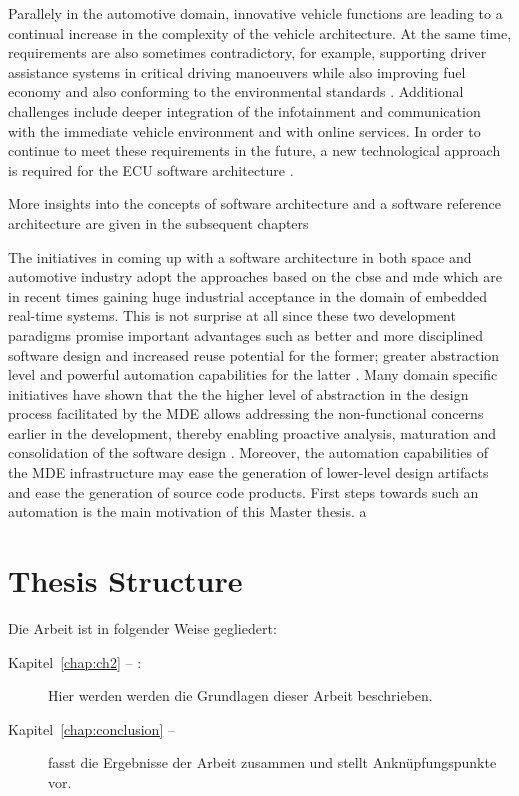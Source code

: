 Parallely in the automotive domain, innovative vehicle functions are leading to a continual increase in the complexity of the vehicle architecture. At the same time, requirements are also sometimes contradictory, for example, supporting driver assistance systems in critical driving manoeuvers while also improving fuel economy and also conforming to the environmental standards \cite{AUTOSARurl}. Additional challenges include deeper integration of the infotainment and communication with the immediate vehicle environment and with online services. In order to continue to meet these requirements in the future, a new technological approach is required for the ECU software architecture \cite{AUTOSARurl}.  

More insights into the concepts of software architecture and a software reference architecture are given in the subsequent chapters     

The initiatives in coming up with a software architecture in both space and automotive industry adopt the approaches based on the \ac{cbse} and \ac{mde} which are in recent times gaining huge industrial acceptance in the domain of embedded real-time systems. This is not surprise at all since these two development paradigms promise important advantages such as better and more disciplined software design and increased reuse potential for the former; greater abstraction level and powerful automation capabilities for the latter \cite{CBSE}\cite{PhdThesis}. Many domain specific initiatives have shown that the the higher level of abstraction in the design process facilitated by the MDE allows addressing the non-functional concerns earlier in the development, thereby enabling proactive analysis, maturation and consolidation of the software design \cite{CompBasedDev}. Moreover, the automation capabilities of the MDE infrastructure may ease the generation of lower-level design artifacts and ease the generation of source code products.
First steps towards such an automation is the main motivation of this Master thesis.  a

\section*{Thesis Structure}
Die Arbeit ist in folgender Weise gegliedert:
\begin{description}
\item[Kapitel~\ref{chap:ch2} -- :] Hier werden werden die Grundlagen dieser Arbeit beschrieben.
\item[Kapitel~\ref{chap:conclusion} -- ] fasst die Ergebnisse der Arbeit zusammen und stellt Anknüpfungspunkte vor.
\end{description}
